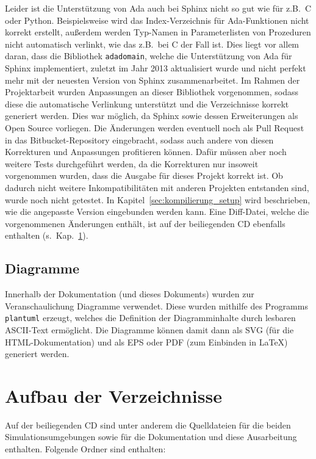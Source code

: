 \documentclass[oneside]{elaboration}
\begin{document}
Leider ist die Unterstützung von Ada auch bei Sphinx nicht so gut wie für z.B.\
C oder Python. Beispielsweise wird das Index-Verzeichnis für Ada-Funktionen
nicht korrekt erstellt, außerdem werden Typ-Namen in Parameterlisten von
Prozeduren nicht automatisch verlinkt, wie das z.B.\ bei C der Fall ist. Dies
liegt vor allem daran, dass die Bibliothek \texttt{adadomain}, welche die
Unterstützung von Ada für Sphinx implementiert, zuletzt im Jahr 2013
aktualisiert wurde und nicht perfekt mehr mit der neuesten Version von Sphinx
zusammenarbeitet. Im Rahmen der Projektarbeit wurden Anpassungen an dieser
Bibliothek vorgenommen, sodass diese die automatische Verlinkung unterstützt und
die Verzeichnisse korrekt generiert werden. Dies war möglich, da Sphinx sowie
dessen Erweiterungen als Open Source vorliegen. Die Änderungen werden eventuell
noch als Pull Request in das Bitbucket-Repository eingebracht, sodass auch
andere von diesen Korrekturen und Anpassungen profitieren können. Dafür müssen
aber noch weitere Tests durchgeführt werden, da die Korrekturen nur insoweit
vorgenommen wurden, dass die Ausgabe für dieses Projekt korrekt ist. Ob dadurch
nicht weitere Inkompatibilitäten mit anderen Projekten entstanden sind, wurde
noch nicht getestet. In Kapitel~\ref{sec:kompilierung_setup} wird beschrieben,
wie die angepasste Version eingebunden werden kann. Eine Diff-Datei, welche die
vorgenommenen Änderungen enthält, ist auf der beiliegenden CD ebenfalls
enthalten (s.\ Kap.~\ref{sec:aufbau_der_verzeichnisse}).

\subsection{Diagramme}
\label{sec:diagramme}

Innerhalb der Dokumentation (und dieses Dokuments) wurden zur
Veranschaulichung Diagramme verwendet. Diese wurden mithilfe des Programms
\texttt{plantuml} erzeugt, welches die Definition der Diagramminhalte durch
lesbaren ASCII-Text ermöglicht. Die Diagramme können damit dann als SVG (für die
HTML-Dokumentation) und als EPS oder PDF (zum Einbinden in LaTeX) generiert
werden.

\section{Aufbau der Verzeichnisse}
\label{sec:aufbau_der_verzeichnisse}

Auf der beiliegenden CD sind unter anderem die Quelldateien für die beiden
Simulationsumgebungen sowie für die Dokumentation und diese Ausarbeitung
enthalten. Folgende Ordner sind enthalten:
\end{document}
